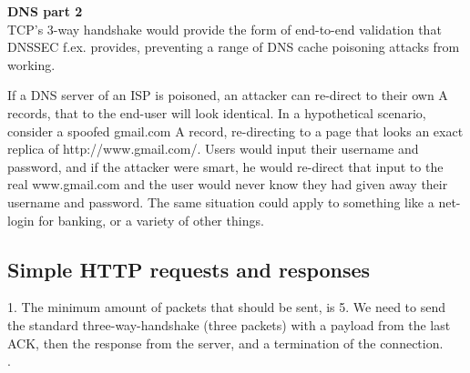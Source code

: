 \noindent \textbf{DNS part 2} \\
TCP's 3-way handshake would provide the form of end-to-end validation that DNSSEC f.ex. provides, preventing
a range of DNS cache poisoning attacks from working. 

If a DNS server of an ISP is poisoned, an attacker can re-direct to their own A records, that to the end-user will
look identical. In a hypothetical scenario, consider a spoofed gmail.com A record, re-directing to a page that looks
an exact replica of http://www.gmail.com/. Users would input their username and password, and if the attacker were smart,
he would re-direct that input to the real www.gmail.com and the user would never know they had given away their username
and password. The same situation could apply to something like a net-login for banking, or a variety of other things.

\subsection*{Simple HTTP requests and responses}
1. The minimum amount of packets that should be sent, is 5. We need to send the
standard three-way-handshake (three packets) with a payload from the last ACK,
then the response from the server, and a termination of the connection. \\

. 
